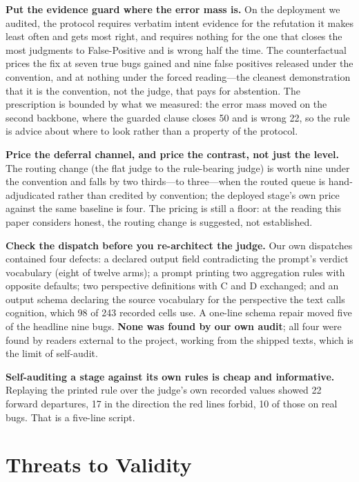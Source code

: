\documentclass[acmsmall,screen,review,anonymous]{acmart}
\begin{document}
\textbf{Put the evidence guard where the error mass is.} On the deployment we audited, the protocol
requires verbatim intent evidence for the refutation it makes least often and gets most right, and
requires nothing for the one that closes the most judgments to False-Positive and is wrong half the
time. The counterfactual prices the fix at seven true bugs gained and nine false positives released
under the convention, and at nothing under the forced reading---the cleanest demonstration that it is
the convention, not the judge, that pays for abstention. The prescription is bounded by what we
measured: the error mass moved on the second backbone, where the guarded clause closes 50 and is
wrong 22, so the rule is advice about where to look rather than a property of the protocol.

\textbf{Price the deferral channel, and price the contrast, not just the level.} The routing change
(the flat judge to the rule-bearing judge) is worth nine under the convention and falls by two
thirds---to three---when the routed queue is hand-adjudicated rather than credited by convention; the
deployed stage's own price against the same baseline is four. The pricing is still a floor: at the
reading this paper considers honest, the routing change is suggested, not established.

\textbf{Check the dispatch before you re-architect the judge.} Our own dispatches contained four
defects: a declared output field contradicting the prompt's verdict vocabulary (eight of twelve
arms); a prompt printing two aggregation rules with opposite defaults; two perspective definitions
with C and D exchanged; and an output schema declaring the source vocabulary for the perspective the
text calls cognition, which 98 of 243 recorded cells use. A one-line schema repair moved five of the
headline nine bugs. \textbf{None was found by our own audit}; all four were found by readers external
to the project, working from the shipped texts, which is the limit of self-audit.

\textbf{Self-auditing a stage against its own rules is cheap and informative.} Replaying the printed
rule over the judge's own recorded values showed 22 forward departures, 17 in the direction the red
lines forbid, 10 of those on real bugs. That is a five-line script.

\section{Threats to Validity}
\label{sec:threats}
\end{document}
